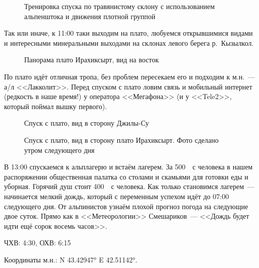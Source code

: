 \begin{figure}[h!]
	\centering
	\caption{Тренировка спуска по травянистому склону с использованием альпенштока и движения плотной группой}
	\label{fig:trenya}
\end{figure}



Так или иначе, к 11:00 таки выходим на плато, любуемся открывшимися видами и интересными минеральными выходами на склонах левого берега р.~Кызылкол.

\begin{figure}[h!]
	\centering
	\caption{Панорама плато Ирахиксырт, вид на восток}
	\label{fig:plauteau}
\end{figure}

По плато идёт отличная тропа, без проблем пересекаем его и подходим к м.н.~--- а/л <<Лакколит>>. Перед спуском с плато ловим связь и мобильный интернет (редкость в наше время!) у оператора <<Мегафона>> (и у <<Tele2>>, который поймал вышку первого).

\begin{figure}[h!]
	\centering
	\caption{Спуск с плато, вид в сторону Джилы-Су}
	\label{fig:lakkolit}
\end{figure}

\begin{figure}[h!]
	\centering
	\caption{Спуск с плато, вид в сторону плато Ирахиксырт. Фото сделано утром следующего дня}
	\label{fig:lakkolit2}
\end{figure}

В 13:00 спускаемся к альплагерю и встаём лагерем. За 500~\faRub~с человека в нашем распоряжении общественная палатка со столами и скамьями для готовки еды и уборная. Горячий душ стоит 400~\faRub~с человека. Как только становимся лагерем~--- начинается мелкий дождь, который с переменным успехом идёт до 07:00 следующего дня. От альпинистов узнаём плохой прогноз погода на следующие двое суток. Прямо как в <<Метеорологии>> Смешариков~--- <<Дождь будет идти ещё сорок восемь часов>>.

ЧХВ: 4:30, ОХВ: 6:15

Координаты м.н.: N 43.42947° E 42.51142°.

\clearpage